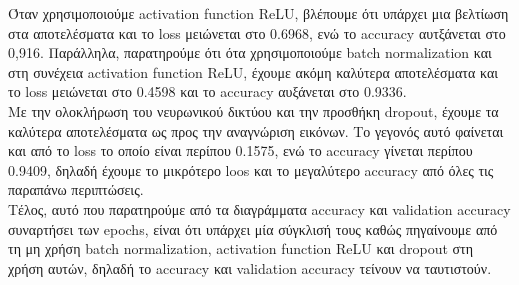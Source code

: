 \documentclass{article}
\begin{document}
	\noindent
	Όταν χρησιμοποιούμε activation function ReLU, βλέπουμε ότι υπάρχει μια βελτίωση στα αποτελέσματα και το loss μειώνεται στο 0.6968, ενώ το accuracy αυτξάνεται στο 0,916. Παράλληλα, παρατηρούμε ότι ότα χρησιμοποιούμε batch normalization και στη συνέχεια activation function ReLU, έχουμε ακόμη καλύτερα αποτελέσματα και το loss μειώνεται στο 0.4598 και το accuracy αυξάνεται στο 0.9336.\\
	
	\noindent
	Με την ολοκλήρωση του νευρωνικού δικτύου και την προσθήκη dropout, έχουμε τα καλύτερα αποτελέσματα ως προς την αναγνώριση εικόνων. Το γεγονός αυτό φαίνεται και από το loss το οποίο είναι περίπου 0.1575, ενώ το accuracy γίνεται περίπου 0.9409, δηλαδή έχουμε το μικρότερο loos και το μεγαλύτερο accuracy από όλες τις παραπάνω περιπτώσεις.\\
	
	\noindent
	Τέλος, αυτό που παρατηρούμε από τα διαγράμματα accuracy και validation accuracy συναρτήσει των epochs, είναι ότι υπάρχει μία σύγκλισή τους καθώς πηγαίνουμε από τη μη χρήση batch normalization, activation function ReLU και dropout στη χρήση αυτών, δηλαδή το accuracy και validation accuracy τείνουν να ταυτιστούν.  
	
\end{document}
